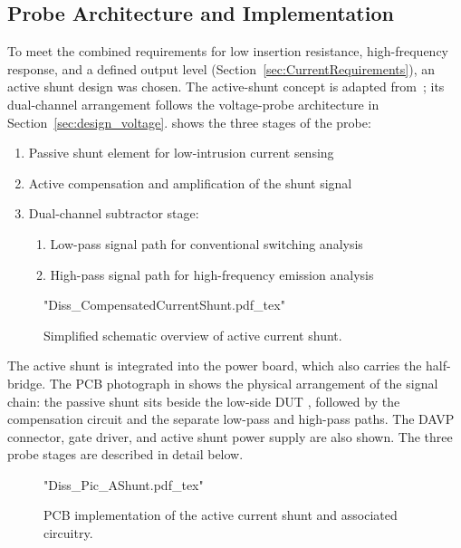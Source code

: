 
\subsection{Probe Architecture and Implementation}

To meet the combined requirements for low insertion resistance, high-frequency response, and a defined output level (Section~\ref{sec:CurrentRequirements}), an active shunt design was chosen.
The active-shunt concept is adapted from~\cite{shillaber_gigahertz_2020,shillaber_ultrafast_2022}; its dual-channel arrangement follows the voltage-probe architecture in Section~\ref{sec:design_voltage}.
 shows the three stages of the probe:
\begin{enumerate}
	\item Passive shunt element for low-intrusion current sensing
	\item Active compensation and amplification of the shunt signal
	\item Dual-channel subtractor stage:
	\begin{enumerate}
		\item Low-pass signal path for conventional switching analysis
		\item High-pass signal path for high-frequency emission analysis
	\end{enumerate}
\end{enumerate}


\begin{figure}[htbp]
	\centering
	{"Diss_CompensatedCurrentShunt.pdf_tex"}
	\caption{Simplified schematic overview of active current shunt.}\label{fig:ESBActiveShunt}
\end{figure}

The active shunt is integrated into the power board, which also carries the half-bridge.
The PCB photograph in  shows the physical arrangement of the signal chain: the passive shunt sits beside the low-side DUT , followed by the compensation circuit and the separate low-pass and high-pass paths.
The DAVP connector, gate driver, and active shunt power supply are also shown.
The three probe stages are described in detail below.


\begin{figure}[ht]
	\centering
	{"Diss_Pic_AShunt.pdf_tex"}
	\caption{PCB implementation of the active current shunt and associated circuitry.}\label{fig:ESBActiveShuntPhoto}
\end{figure}


